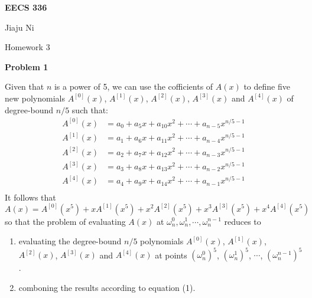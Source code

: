 \documentclass[12pt,letterpaper]{article}
\def\pp{\par\noindent}
\newcommand{\problem}[1]{ \bigskip \pp \textbf{Problem #1}\par}
\begin{document}
\centerline{\bf EECS 336}

\medskip
\centerline{Jiaju Ni}
\centerline{Homework 3}
\bigskip


\problem{1}
Given that $n$ is a power of 5, we can use the cofficients of $A(x)$ to define five new polynomials $A^{[0]}(x)$, $A^{[1]}(x)$, $A^{[2]}(x)$, $A^{[3]}(x)$ and $A^{[4]}(x)$ of degree-bound $n/5$ such that:
\begin{align*}
	A^{[0]}(x)&=a_0+a_5x+a_{10}x^2+\cdots+a_{n-5}x^{n/5-1}\\
	A^{[1]}(x)&=a_1+a_6x+a_{11}x^2+\cdots+a_{n-4}x^{n/5-1}\\
	A^{[2]}(x)&=a_2+a_7x+a_{12}x^2+\cdots+a_{n-3}x^{n/5-1}\\
	A^{[3]}(x)&=a_3+a_8x+a_{13}x^2+\cdots+a_{n-2}x^{n/5-1}\\
	A^{[4]}(x)&=a_4+a_9x+a_{14}x^2+\cdots+a_{n-1}x^{n/5-1}\\
\end{align*}
It follows that
\begin{equation}
	A(x)=A^{[0]}(x^5)+xA^{[1]}(x^5)+x^2A^{[2]}(x^5)+x^3A^{[3]}(x^5)+x^4A^{[4]}(x^5)
\end{equation}
so that the problem of evaluating $A(x)$ at $\omega_n^0, \omega_n^1, \cdots, \omega_n^{n-1}$ reduces to 
\begin{enumerate}
	\item evaluating the degree-bound $n/5$ polynomials $A^{[0]}(x)$, $A^{[1]}(x)$, $A^{[2]}(x)$, $A^{[3]}(x)$ and $A^{[4]}(x)$ at points $(\omega_n^0)^5$, $(\omega_n^1)^5$, $\cdots$, $(\omega_n^{n-1})^5$.
	\item comboning the results according to equation (1).
\end{enumerate}
\end{document}
